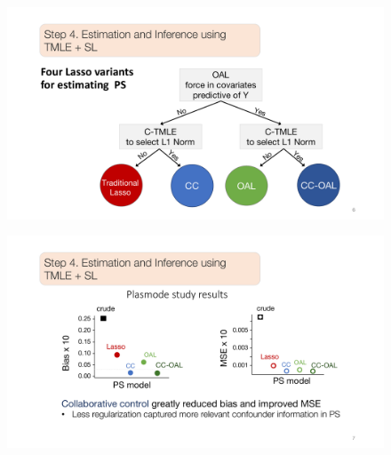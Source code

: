 \documentclass[t]{beamer}
\begin{document}
\begin{frame}
\centering
\begin{figure}
\begin{center}
\includegraphics[width=1.02\textwidth]{figures/abbviepdfslides_6.pdf}
\end{center}
\end{figure}
\end{frame}

\begin{frame}
\centering
\begin{figure}
\begin{center}
\includegraphics[width=1.02\textwidth]{figures/abbviepdfslides_7.pdf}
\end{center}
\end{figure}
\end{frame}
\end{document}
